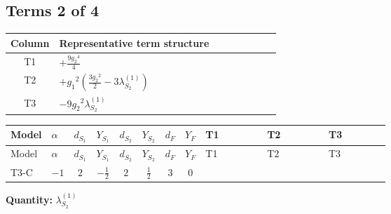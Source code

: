 \documentclass[8pt]{article}
\begin{document}
\begin{landscape}
\subsection*{Terms 2 of 4}
\begin{center}
\begin{tabular}{@{}c >{\raggedright\arraybackslash}p{0.82\linewidth}@{}}
\toprule
Column & Representative term structure \\
\midrule
T1 & \(\displaystyle +\frac{9 {g_2}^4}{4}\) \\
\midrule
T2 & \(\displaystyle +{g_1}^2 \left(\frac{3 {g_2}^2}{2}-3 {\lambda_{S_2}^{(1)}}\right)\) \\
\midrule
T3 & \(\displaystyle -9 {g_2}^2 {\lambda_{S_2}^{(1)}}\) \\
\midrule
\bottomrule
\end{tabular}
\end{center}
\smallskip
\tiny
\begin{longtable}{@{}llcccccc >{\raggedright\arraybackslash}p{0.21\linewidth} >{\raggedright\arraybackslash}p{0.21\linewidth} >{\raggedright\arraybackslash}p{0.21\linewidth}@{}}
\toprule
Model & $\alpha$ & $d_{S_1}$ & $Y_{S_1}$ & $d_{S_2}$ & $Y_{S_2}$ & $d_F$ & $Y_F$ & T1 & T2 & T3 \\
\midrule
\endfirsthead
\toprule
Model & $\alpha$ & $d_{S_1}$ & $Y_{S_1}$ & $d_{S_2}$ & $Y_{S_2}$ & $d_F$ & $Y_F$ & T1 & T2 & T3 \\
\midrule
\endhead
T3-C & $-1$ & $2$ & $-\frac{1}{2}$ & $2$ & $\frac{1}{2}$ & $3$ & $0$ & \scriptsize\adjustbox{max width=\linewidth}{$\begin{gathered} +\frac{9 {g_2}^4}{4}\end{gathered}$} & \scriptsize\adjustbox{max width=\linewidth}{$\begin{gathered} +{g_1}^2 \left(\frac{3 {g_2}^2}{2}-3 {\lambda_{S_2}^{(1)}}\right)\end{gathered}$} & \scriptsize\adjustbox{max width=\linewidth}{$\begin{gathered} -9 {g_2}^2 {\lambda_{S_2}^{(1)}}\end{gathered}$} \\
\midrule
\bottomrule
\end{longtable}
\clearpage
\noindent\textbf{Quantity: }$\lambda_{S_2}^{(1)}$\par\smallskip

\end{landscape}
\end{document}
